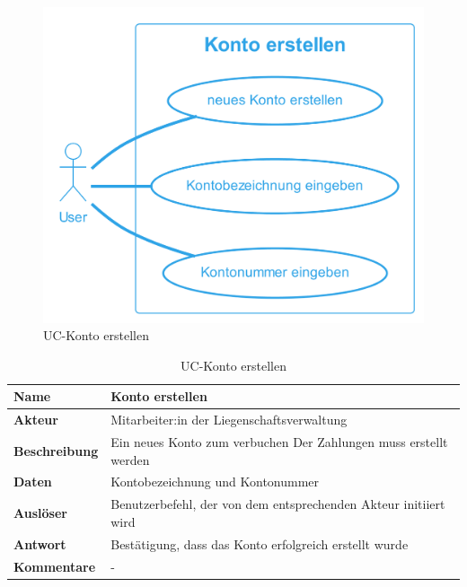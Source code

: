 \newpage
\begin{figure}[H]
  \begin{center}
    \includegraphics[width=0.5\linewidth]{content/diagrams/out/usecase/kontoErstellen/kontoErstellen.png}
    \caption{UC-Konto erstellen}
    \label{kontoErstellen}
  \end{center}
\end{figure}

\begin{table}[H]
  \centering
  \settowidth{}
  \setlength\extrarowheight{2pt}
  \begin{tabulary}{1.0\textwidth}{|a|m{14cm}|}
    \hline
    \textbf{Name}& Konto erstellen\\
    \hline
    \textbf{Akteur}& Mitarbeiter:in der Liegenschaftsverwaltung\\
    \hline 
    \textbf{Beschreibung} & Ein neues Konto zum verbuchen Der Zahlungen muss erstellt werden\\
    \hline
    \textbf{Daten} & Kontobezeichnung und Kontonummer\\
    \hline
    \textbf{Auslöser} & Benutzerbefehl, der von dem entsprechenden Akteur initiiert wird\\
    \hline
    \textbf{Antwort} & Bestätigung, dass das Konto erfolgreich erstellt wurde\\
    \hline
    \textbf{Kommentare} & -\\
    \hline
  \end{tabulary}
  \caption{UC-Konto erstellen}
\end{table}

